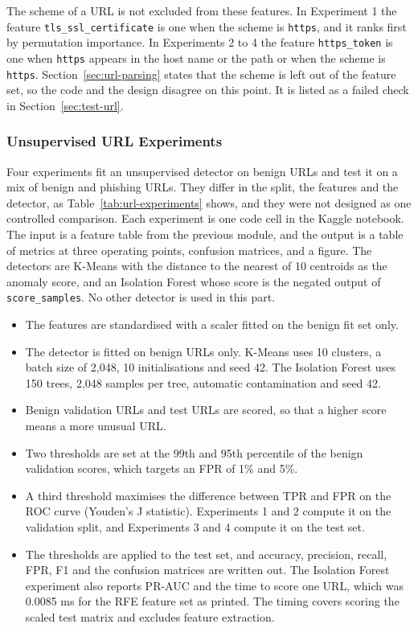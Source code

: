 \documentclass{FastFyp}
\begin{document}
The scheme of a URL is not excluded from these features. In Experiment 1 the feature \texttt{tls\_ssl\_certificate} is one when the scheme is \texttt{https}, and it ranks first by permutation importance. In Experiments 2 to 4 the feature \texttt{https\_token} is one when \texttt{https} appears in the host name or the path or when the scheme is \texttt{https}. Section~\ref{sec:url-parsing} states that the scheme is left out of the feature set, so the code and the design disagree on this point. It is listed as a failed check in Section~\ref{sec:test-url}.

\subsubsection{Unsupervised URL Experiments}
\label{sec:impl-url-experiments}
Four experiments fit an unsupervised detector on benign URLs and test it on a mix of benign and phishing URLs. They differ in the split, the features and the detector, as Table~\ref{tab:url-experiments} shows, and they were not designed as one controlled comparison. Each experiment is one code cell in the Kaggle notebook. The input is a feature table from the previous module, and the output is a table of metrics at three operating points, confusion matrices, and a figure. The detectors are K-Means with the distance to the nearest of 10 centroids as the anomaly score, and an Isolation Forest whose score is the negated output of \texttt{score\_samples}. No other detector is used in this part.
\begin{itemize}
	\item The features are standardised with a scaler fitted on the benign fit set only.
	\item The detector is fitted on benign URLs only. K-Means uses 10 clusters, a batch size of 2,048, 10 initialisations and seed 42. The Isolation Forest uses 150 trees, 2,048 samples per tree, automatic contamination and seed 42.
	\item Benign validation URLs and test URLs are scored, so that a higher score means a more unusual URL.
	\item Two thresholds are set at the 99th and 95th percentile of the benign validation scores, which targets an FPR of 1\% and 5\%.
	\item A third threshold maximises the difference between TPR and FPR on the ROC curve (Youden's J statistic). Experiments 1 and 2 compute it on the validation split, and Experiments 3 and 4 compute it on the test set.
	\item The thresholds are applied to the test set, and accuracy, precision, recall, FPR, F1 and the confusion matrices are written out. The Isolation Forest experiment also reports PR-AUC and the time to score one URL, which was 0.0085 ms for the RFE feature set as printed. The timing covers scoring the scaled test matrix and excludes feature extraction.
\end{itemize}
\end{document}
